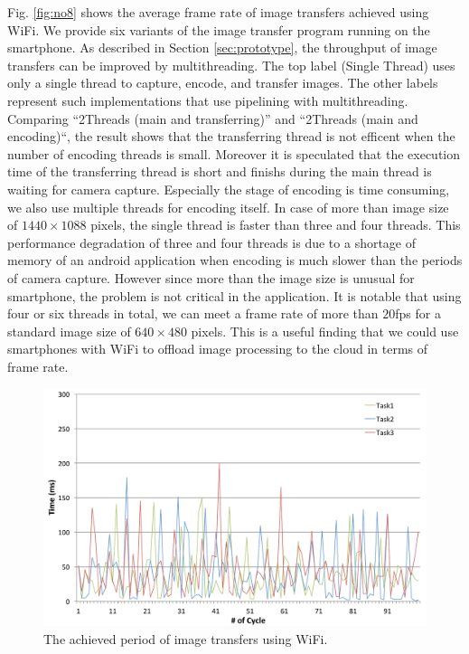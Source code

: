 Fig. \ref{fig:no8} shows the average frame rate of image transfers
achieved using WiFi.
We provide six variants of the image transfer program running on the
smartphone.
As described in Section \ref{sec:prototype}, the throughput of image
transfers can be improved by multithreading.
The top label (Single Thread) uses only a single thread to capture,
encode, and transfer images.
The other labels represent such implementations that use pipelining with
multithreading.
Comparing ``2Threads (main and transferring)''  and ``2Threads (main and encoding)``,
the result shows that the transferring thread is not efficent when the number of encoding threads is small.
Moreover it is speculated that the execution time of the transferring thread is short and finishs during the main thread is waiting for camera capture.
Especially the stage of encoding is time consuming, we also use multiple
threads for encoding itself.
In case of more than image size of $1440 \times 1088$ pixels, the single thread is faster than three and four threads.
This performance degradation of three and four threads is due to a shortage of memory of an android application when encoding is much slower than the periods of camera capture. 
However since more than the image size is unusual for smartphone, the problem is not critical in the application.
It is notable that using four or six threads in total, we can meet a
frame rate of more than $20$fps for a standard image size of $640 \times
480$ pixels.
This is a useful finding that we could use smartphones with WiFi to
offload image processing to the cloud in terms of frame rate.

\begin{figure}[!t]
 \centering
 \includegraphics[width=0.8\hsize]{fig/No9_TIPiC_serv_cycle_WiFi.pdf}
 \caption{The achieved period of image transfers using WiFi.}
 \label{fig:no9}
\end{figure}

